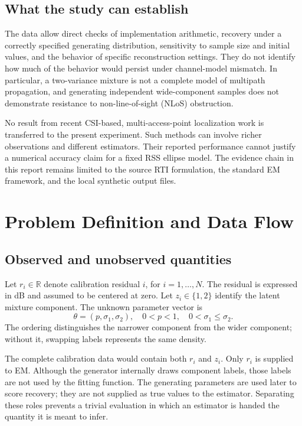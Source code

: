 \documentclass[conference,letterpaper]{IEEEtran}
\newcommand{\R}{\mathbb{R}}
\begin{document}
\subsection{What the study can establish}
The data allow direct checks of implementation arithmetic, recovery under a correctly specified generating distribution, sensitivity to sample size and initial values, and the behavior of specific reconstruction settings. They do not identify how much of the behavior would persist under channel-model mismatch. In particular, a two-variance mixture is not a complete model of multipath propagation, and generating independent wide-component samples does not demonstrate resistance to non-line-of-sight (NLoS) obstruction.

No result from recent CSI-based, multi-access-point localization work is transferred to the present experiment. Such methods can involve richer observations and different estimators. Their reported performance cannot justify a numerical accuracy claim for a fixed RSS ellipse model. The evidence chain in this report remains limited to the source RTI formulation, the standard EM framework, and the local synthetic output files.

\section{Problem Definition and Data Flow}
\subsection{Observed and unobserved quantities}
Let $r_i\in\R$ denote calibration residual $i$, for $i=1,\ldots,N$. The residual is expressed in dB and assumed to be centered at zero. Let $z_i\in\{1,2\}$ identify the latent mixture component. The unknown parameter vector is
\begin{equation}
\theta=(p,\sigma_1,\sigma_2),\quad 0<p<1,\quad 0<\sigma_1\leq\sigma_2.
\end{equation}
The ordering distinguishes the narrower component from the wider component; without it, swapping labels represents the same density.

The complete calibration data would contain both $r_i$ and $z_i$. Only $r_i$ is supplied to EM. Although the generator internally draws component labels, those labels are not used by the fitting function. The generating parameters are used later to score recovery; they are not supplied as true values to the estimator. Separating these roles prevents a trivial evaluation in which an estimator is handed the quantity it is meant to infer.
\end{document}

